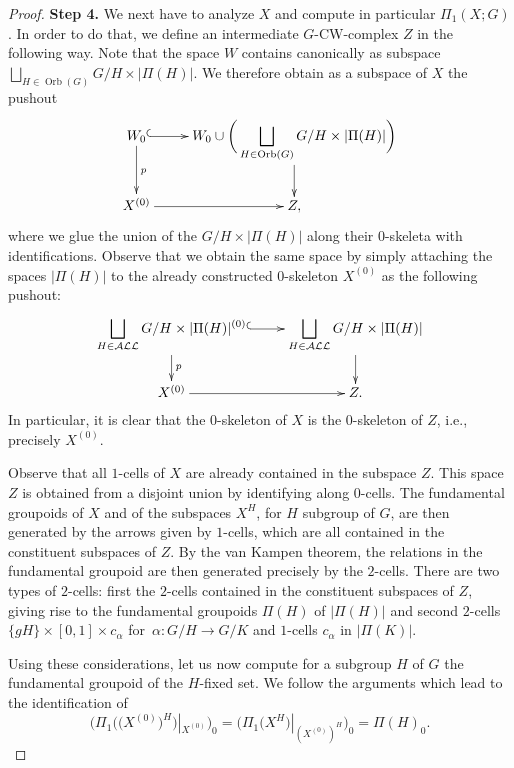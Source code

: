 \documentclass[pdftex]{sigma}
\numberwithin{equation}{section}
\newcommand{\bigdisjointunion}{\bigsqcup}
\DeclareMathOperator{\Orb}{Orb}
\begin{document}
\begin{proof}
\textbf{Step 4.} We next have to analyze $X$ and compute in particular $\Pi_1(X;G)$. In order to do that, we define an intermediate $G$-CW-complex $Z$ in the following way.
		Note that the space $W$ contains canonically as subspace
		$\bigdisjointunion_{H\in\Orb(G)} G/H\times |\Pi(H)|$. We therefore obtain as
		a subspace of $X$ the pushout
		\begin{equation*}
			\xymatrix{W_0\ar@{^{(}->}[r]\ar[d]^p & W_0 \cup \bigg(\displaystyle\bigdisjointunion_{H\in\Orb(G)} G/H\times |\Pi(H)|\bigg)\ar[d]\\
				X^{(0)}\ar[r]& Z,}
		\end{equation*}
		where we glue the union of the $G/H\times |\Pi(H)|$ along their $0$-skeleta
		with identifications.
		Observe that we obtain the same space by simply attaching the spaces $|\Pi(H)|$ to the already constructed
		$0$-skeleton $X^{(0)}$ as the following pushout:
		\begin{equation*}
			\xymatrix{
				\displaystyle\bigdisjointunion_{H\in\mathcal{ALL}} G/H \times |\Pi(H)|^{(0)} \ar@{^{(}->}[r]\ar[d]^(.6){p}&
				\displaystyle\bigdisjointunion_{H\in\mathcal{ALL}} G/H \times |\Pi(H)|\ar[d]\\
				X^{(0)} \ar[r]& Z.
			}
		\end{equation*}
		In particular, it is clear that the $0$-skeleton of $X$ is the $0$-skeleton of $Z$,
		i.e., precisely $X^{(0)}$.
		
		Observe that all $1$-cells of $X$ are already contained in the subspace
		$Z$. This space $Z$ is obtained from a disjoint union by identifying along
		$0$-cells. The fundamental groupoids of $X$ and of the
		subspaces $X^H$, for $H$ subgroup of $G$, are then generated by the arrows given by $1$-cells, which are all
		contained in the constituent subspaces of $Z$. By the van Kampen theorem, the
		relations in the fundamental groupoid are then generated precisely by the
		$2$-cells. There are two types of $2$-cells: first the $2$-cells contained in the constituent
		subspaces of $Z$, giving rise to the fundamental groupoids $\Pi(H)$ of
		$|\Pi(H)|$ and second $2$-cells $\{gH\}\times [0,1]\times c_\alpha$ for~${\alpha\colon G/H\to G/K}$ and $1$-cells $c_\alpha$ in $|\Pi(K)|$.
		
		Using these considerations, let us now compute for a subgroup $H$ of $G$ the
		fundamental groupoid  of the $H$-fixed set. We follow the
		arguments which lead to the identification of
		\begin{equation*}
			\bigl(\Pi_1\bigl(\bigl(X^{(0)}\bigr)^H\bigr)|_{X^{(0)}}\bigr)_0=\bigl(\Pi_1 \bigl(X^H\bigr)|_{ (X^{(0)} )^H}\bigr)_0=\Pi(H)_0.
		\end{equation*}
		

\end{proof}
\end{document}
